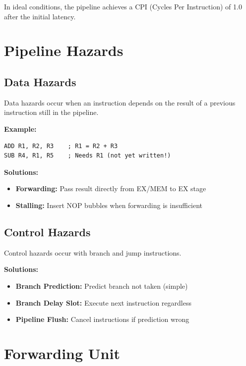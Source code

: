 \documentclass[12pt,a4paper,oneside]{book}
\begin{document}
In ideal conditions, the pipeline achieves a CPI (Cycles Per Instruction) of 1.0 after the initial latency.

\section{Pipeline Hazards}

\subsection{Data Hazards}

Data hazards occur when an instruction depends on the result of a previous instruction still in the pipeline.

\textbf{Example:}
\begin{lstlisting}[style=assembly]
ADD R1, R2, R3    ; R1 = R2 + R3
SUB R4, R1, R5    ; Needs R1 (not yet written!)
\end{lstlisting}

\textbf{Solutions:}
\begin{itemize}
    \item \textbf{Forwarding:} Pass result directly from EX/MEM to EX stage
    \item \textbf{Stalling:} Insert NOP bubbles when forwarding is insufficient
\end{itemize}

\subsection{Control Hazards}

Control hazards occur with branch and jump instructions.

\textbf{Solutions:}
\begin{itemize}
    \item \textbf{Branch Prediction:} Predict branch not taken (simple)
    \item \textbf{Branch Delay Slot:} Execute next instruction regardless
    \item \textbf{Pipeline Flush:} Cancel instructions if prediction wrong
\end{itemize}

\section{Forwarding Unit}
\end{document}
